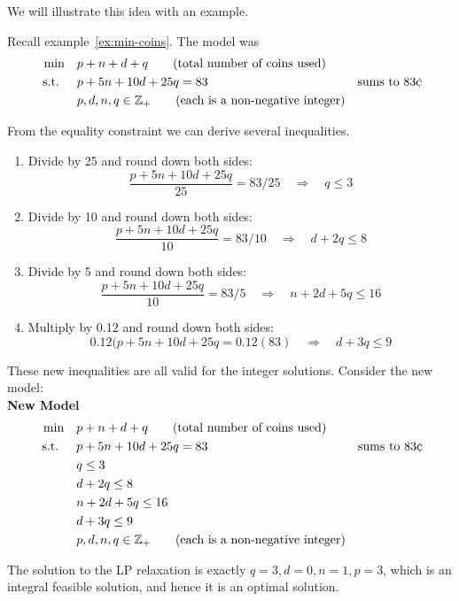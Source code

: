 We will illustrate this idea with an example.

\begin{example}{}{}
Recall example~\ref{ex:min-coins}.  The model was\\
\begin{align*}
\min \quad & p + n + d + q   \tag{total number of coins used} \\
\st \quad  & p + 5n + 10d + 25 q = 83 & \text{sums to } 83 \cent \\
& p,d,n,q \in \Z_+   \tag{each is a non-negative integer}
\end{align*}

From the equality constraint we can derive several inequalities.
\begin{enumerate}
\item Divide by 25 and round down both sides:
\[
\frac{p + 5n + 10d + 25 q}{25} = 83/25 \quad \Rightarrow \quad q \leq 3 
\]
\item Divide by 10 and round down both sides:
\[
\frac{p + 5n + 10d + 25 q}{10} = 83/10 \quad \Rightarrow \quad d + 2q \leq 8 
\]
\item Divide by 5 and round down both sides:
\[
\frac{p + 5n + 10d + 25 q}{10} = 83/5 \quad \Rightarrow \quad n + 2d  + 5q \leq 16
\]
\item Multiply by 0.12 and round down both sides:
\[
0.12(p + 5n + 10d + 25 q = 0.12 (83) \quad \Rightarrow \quad d  + 3q \leq 9
\]
\end{enumerate}
These new inequalities are all valid for the integer solutions.  Consider the new model:\\

\textbf{New Model}
\begin{align*}
\min \quad & p + n + d + q   \tag{total number of coins used} \\
\st \quad  & p + 5n + 10d + 25 q = 83 & \text{sums to } 83 \cent \\
& q \leq 3 \\
& d + 2q \leq 8 \\
& n + 2d  + 5q \leq 16 \\
& d  + 3q \leq 9 \\
& p,d,n,q \in \Z_+   \tag{each is a non-negative integer}
\end{align*}

The solution to the LP relaxation is exactly $q = 3, d = 0, n = 1, p = 3$, which is an integral feasible solution, and hence it is an optimal solution.
\end{example}

